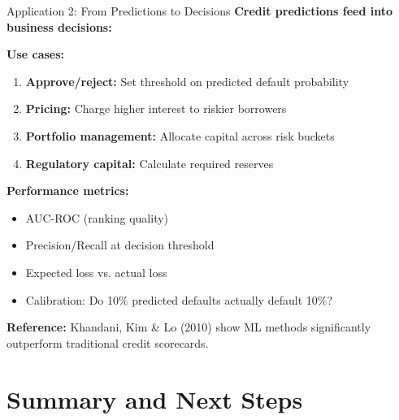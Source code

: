 \documentclass[10pt]{beamer}
\begin{document}
\begin{frame}{Application 2: From Predictions to Decisions}
  \textbf{Credit predictions feed into business decisions:}
  
  \vspace{1em}
  \textbf{Use cases:}
  \begin{enumerate}
    \item \textbf{Approve/reject:} Set threshold on predicted default probability
    \item \textbf{Pricing:} Charge higher interest to riskier borrowers
    \item \textbf{Portfolio management:} Allocate capital across risk buckets
    \item \textbf{Regulatory capital:} Calculate required reserves
  \end{enumerate}
  
  \vspace{0.5em}
  \textbf{Performance metrics:}
  \begin{itemize}
    \item AUC-ROC (ranking quality)
    \item Precision/Recall at decision threshold
    \item Expected loss vs. actual loss
    \item Calibration: Do 10\% predicted defaults actually default 10\%?
  \end{itemize}
  
  \vspace{0.5em}
  \textbf{Reference:} Khandani, Kim \& Lo (2010) show ML methods significantly outperform traditional credit scorecards.
\end{frame}


\section{Summary and Next Steps}
\end{document}
